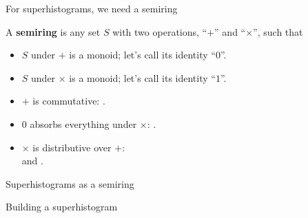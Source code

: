\documentclass[aspectratio=169]{beamer}
\begin{document}
\begin{frame}{For superhistograms, we need a semiring}
\large
\vspace{0.5 cm}

A {\bf semiring} is any set $S$ with two operations, ``$+$'' and ``$\times$'', such that

\vspace{0.25 cm}
\begin{center}
\begin{minipage}{0.9\linewidth}
\begin{itemize}
\item $S$ under $+$ is a monoid; let's call its identity ``$0$''.
\item $S$ under $\times$ is a monoid; let's call its identity ``$1$''.
\item $+$ is commutative: .
\item $0$ absorbs everything under $\times$: .
\item $\times$ is distributive over $+$:  \\ \hfill and .\mbox{\hspace{1.525 cm}}
\end{itemize}
\end{minipage}
\end{center}

\vspace{0.5 cm}
\end{frame}

\begin{frame}{Superhistograms as a semiring}
\large
\vspace{0.5 cm}

Building a superhistogram 





\end{frame}
\end{document}
